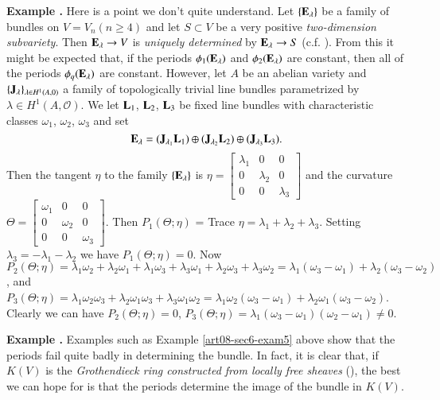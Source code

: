 \medskip
\noindent
{\bf Example .\label{art08-sec6-exam5}}
Here is a point we don't quite understand. Let $\{\mathbf{E}_{\lambda}\}$ be a family of bundles on $V=V_{n}(n\geq 4)$ and let $S\subset V$ be a very positive {\em two-dimension subvariety}. Then $\mathbf{E}_{\lambda}\to V$ is {\em uniquely determined} by $\mathbf{E}_{\lambda}\to S$ (c.f. \cite{art08-key8}). From this it might be expected that, if the periods $\phi_{1}(\mathbf{E}_{\lambda})$ and $\phi_{2}(\mathbf{E}_{\lambda})$ are constant, then all of the periods $\phi_{q}(\mathbf{E}_{\lambda})$ are constant. However, let $A$ be an abelian variety and $\{\mathbf{J}_{\lambda}\}_{\lambda\in H^{1}(A,0)}$ a family of topologically trivial line bundles parametrized by $\lambda\in H^{1}(A,\mathcal{O})$. We let $\mathbf{L}_{1}$, $\mathbf{L}_{2}$, $\mathbf{L}_{3}$ be fixed line bundles with characteristic classes $\omega_{1}$, $\omega_{2}$, $\omega_{3}$ and set
$$
\mathbf{E}_{\lambda}=(\mathbf{J}_{\lambda_{1}}\mathbf{L}_{1})\oplus (\mathbf{J}_{\lambda_{2}}\mathbf{L}_{2})\oplus (\mathbf{J}_{\lambda_{3}}\mathbf{L}_{3}).
$$
Then the tangent $\eta$ to the family $\{\mathbf{E}_{\lambda}\}$ is $\eta=\left[\begin{smallmatrix} \lambda_{1} & 0 & 0\\ 0 & \lambda_{2} & 0\\ 0 & 0 & \lambda_{3}\end{smallmatrix}\right]$ and the curvature $\Theta=\left[\begin{smallmatrix} \omega_{1} & 0 & 0\\ 0 & \omega_{2} & 0\\ 0 & 0 & \omega_{3}\end{smallmatrix}\right]$. Then $P_{1}(\Theta;\eta)$ = Trace $\eta=\lambda_{1}+\lambda_{2}+\lambda_{3}$. Setting $\lambda_{3}=-\lambda_{1}-\lambda_{2}$ we have $P_{1}(\Theta;\eta)=0$. Now $P_{2}(\Theta;\eta)=\lambda_{1}\omega_{2}+\lambda_{2}\omega_{1}+\lambda_{1}\omega_{3}+\lambda_{3}\omega_{1}+\lambda_{2}\omega_{3}+\lambda_{3}\omega_{2}=\lambda_{1}(\omega_{3}-\omega_{1})+\lambda_{2}(\omega_{3}-\omega_{2})$, and $P_{3}(\Theta;\eta)=\lambda_{1}\omega_{2}\omega_{3}+\lambda_{2}\omega_{1}\omega_{3}+\lambda_{3}\omega_{1}\omega_{2}=\lambda_{1}\omega_{2}(\omega_{3}-\omega_{1})+\lambda_{2}\omega_{1}(\omega_{3}-\omega_{2})$. Clearly we can have $P_{2}(\Theta;\eta)=0$, $P_{3}(\Theta;\eta)=\lambda_{1}(\omega_{3}-\omega_{1})(\omega_{2}-\omega_{1})\neq 0$.

\medskip
\noindent
{\bf Example .\label{art08-sec6-exam6}}
Examples such as Example \ref{art08-sec6-exam5} above show that the periods fail quite badly in determining the bundle. In fact, it is clear that, if $K(V)$ is the {\em Grothendieck ring constructed from locally free sheaves} (\cite{art08-key12}), the best we can hope for is that the periods determine the image of the bundle in $K(V)$.
\smallskip


